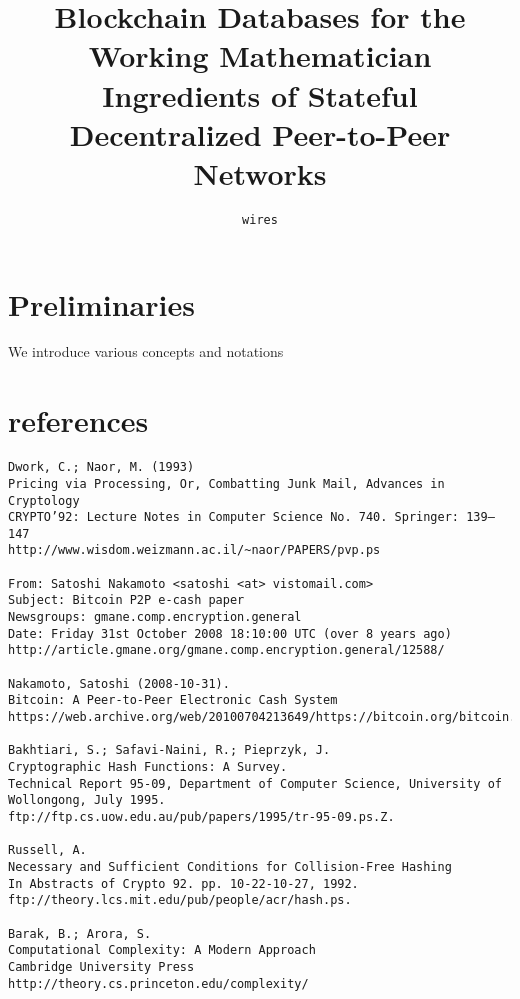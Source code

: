 \documentclass[]{article}
\title{
  {\huge Blockchain Databases for the Working Mathematician}\\[.5em]
  {\Large Ingredients of Stateful Decentralized Peer-to-Peer Networks}
}
\author{\texttt{wires}}
\begin{document}
\maketitle

\begin{abstract}
\end{abstract}





\section{Preliminaries}

We introduce various concepts and notations








\section*{references}

\begin{verbatim}
Dwork, C.; Naor, M. (1993)
Pricing via Processing, Or, Combatting Junk Mail, Advances in Cryptology
CRYPTO’92: Lecture Notes in Computer Science No. 740. Springer: 139–147
http://www.wisdom.weizmann.ac.il/~naor/PAPERS/pvp.ps

From: Satoshi Nakamoto <satoshi <at> vistomail.com>
Subject: Bitcoin P2P e-cash paper
Newsgroups: gmane.comp.encryption.general
Date: Friday 31st October 2008 18:10:00 UTC (over 8 years ago)
http://article.gmane.org/gmane.comp.encryption.general/12588/

Nakamoto, Satoshi (2008-10-31).
Bitcoin: A Peer-to-Peer Electronic Cash System
https://web.archive.org/web/20100704213649/https://bitcoin.org/bitcoin.pdf

Bakhtiari, S.; Safavi-Naini, R.; Pieprzyk, J.
Cryptographic Hash Functions: A Survey.
Technical Report 95-09, Department of Computer Science, University of Wollongong, July 1995.
ftp://ftp.cs.uow.edu.au/pub/papers/1995/tr-95-09.ps.Z.

Russell, A.
Necessary and Sufficient Conditions for Collision-Free Hashing
In Abstracts of Crypto 92. pp. 10-22-10-27, 1992.
ftp://theory.lcs.mit.edu/pub/people/acr/hash.ps.

Barak, B.; Arora, S.
Computational Complexity: A Modern Approach
Cambridge University Press
http://theory.cs.princeton.edu/complexity/

\end{verbatim}
\end{document}
